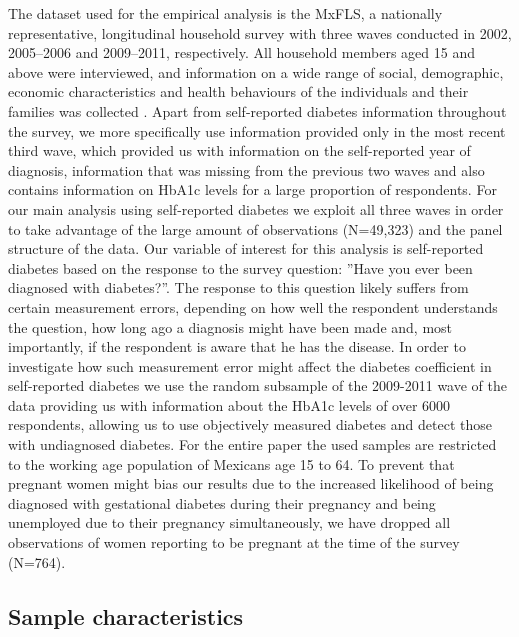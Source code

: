 \documentclass[12pt,english,british]{article}
\begin{document}
The dataset used for the empirical analysis is the \acf{MxFLS},
a nationally representative, longitudinal household survey with three
waves conducted in 2002, 2005--2006 and 2009--2011, respectively.
All household members aged 15 and above were interviewed, and information
on a wide range of social, demographic, economic characteristics and
health behaviours of the individuals and their families was collected
\citep{Rubalcava2013}. Apart from self-reported diabetes information
throughout the survey, we more specifically use information provided only in the most recent third wave, which provided us with information
on the self-reported year of diagnosis, information that was missing
from the previous two waves and also contains information on \ac{HbA1c} levels for a large proportion of respondents.  For our main analysis
using self-reported diabetes we exploit all three waves in order to
take advantage of the large amount of observations (N=49,323) and the panel structure
of the data. Our variable of interest for this analysis is self-reported
diabetes based on the response to the survey question: ''Have you
ever been diagnosed with diabetes?''. The response to this question
likely suffers from certain measurement errors, depending on how well
the respondent understands the question, how long ago a diagnosis
might have been made and, most importantly, if the respondent is aware
that he has the disease. In order to investigate how such measurement
error might affect the diabetes coefficient in self-reported diabetes
we use the random subsample of the 2009-2011 wave of the data providing us with information about the \ac{HbA1c} levels of over 6000 respondents, allowing us to use objectively measured diabetes and detect those with undiagnosed diabetes. For the entire paper the used samples are restricted to the working age population of Mexicans age 15 to 64. To prevent that pregnant women might bias our results due to the increased likelihood of being diagnosed with gestational diabetes during their pregnancy and being unemployed due to their pregnancy simultaneously, we have dropped all observations of women reporting to be pregnant at the time of the survey (N=764).


\subsection{Sample characteristics}
\end{document}
